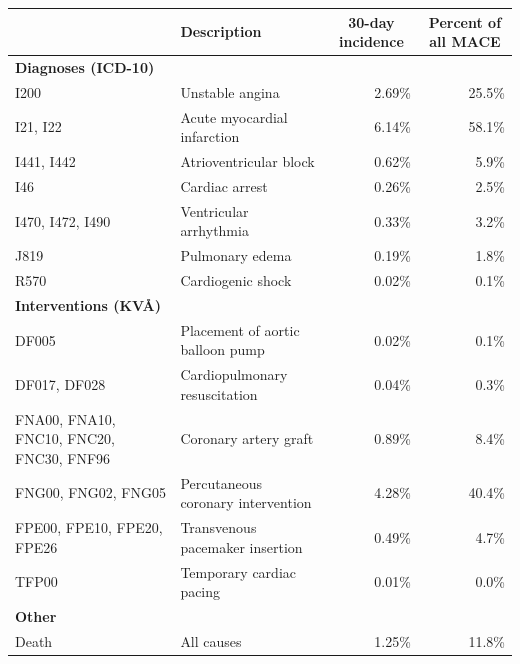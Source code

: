 \documentclass[preprint]{elsarticle}
\begin{document}
\renewcommand{\arraystretch}{1.2}
\begin{table}[H]
  \centering
  \scriptsize
\begin{adjustbox}{center}
\begin{tabular}{@{}p{3.1cm}lrr@{}}
\toprule
& \multicolumn{1}{l}{\textbf{Description}} & \multicolumn{1}{c}{\textbf{30-day incidence}} & \multicolumn{1}{c}{\textbf{Percent of all MACE}} \\
\midrule
\textbf{Diagnoses (ICD-10)} & & & \\
\midrule
I200                                          & Unstable angina                                        &  2.69\%       &   25.5\%   \\
I21, I22                                      & Acute myocardial infarction                            &  6.14\%       &   58.1\%   \\
I441, I442                                    & Atrioventricular block                                 &  0.62\%       &    5.9\%   \\
I46                                           & Cardiac arrest                                         &  0.26\%       &    2.5\%   \\
I470, I472, I490                              & Ventricular arrhythmia                                 &  0.33\%       &    3.2\%   \\
J819                                          & Pulmonary edema                                        &  0.19\%       &    1.8\%   \\
R570                                          & Cardiogenic shock                                      &  0.02\%       &    0.1\%   \\
\midrule
\textbf{Interventions (KV\AA{})} & & & \\
\midrule

DF005                                         & Placement of aortic balloon pump                       &  0.02\%       &    0.1\%   \\
DF017, DF028                                  & Cardiopulmonary resuscitation                          &  0.04\%       &    0.3\%   \\
FNA00, FNA10, FNC10, FNC20, FNC30, FNF96      & Coronary artery graft                                  &  0.89\%       &    8.4\%   \\
FNG00, FNG02, FNG05                           & Percutaneous coronary intervention                     &  4.28\%       &   40.4\%   \\
FPE00, FPE10, FPE20, FPE26                    & Transvenous pacemaker insertion                        &  0.49\%       &    4.7\%   \\
TFP00                                         & Temporary cardiac pacing                               &  0.01\%       &    0.0\%   \\
\midrule
\textbf{Other} & & & \\
\midrule
Death                                         & All causes                                             &  1.25\%       &   11.8\%   \\


\end{tabular}
\end{adjustbox}
\end{table}
\end{document}
